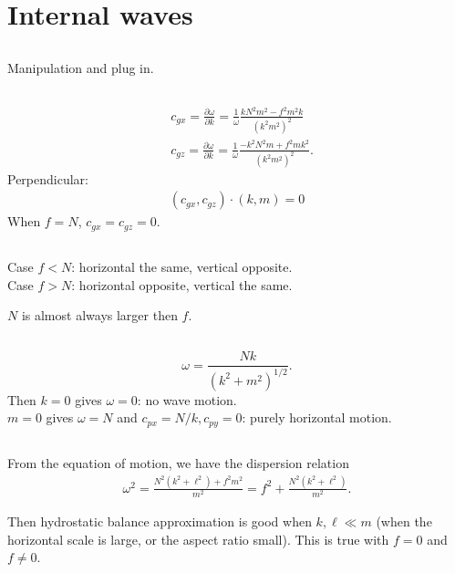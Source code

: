 \documentclass[11pt,letterpaper]{book}
\theoremstyle{definition}
\newcommand{\pe}{\partial}
\begin{document}
\section{Internal waves}\label{Dec_2010_2}
\subsection{}
Manipulation and plug in.

\subsection{}
\begin{align*}
&c_{gx} = \frac{\pe\omega}{\pe k} = \frac{1}{\omega}\frac{kN^2m^2-f^2m^2k}{(k^2m^2)^2}\\
&c_{gz} = \frac{\pe\omega}{\pe k} = \frac{1}{\omega}\frac{-k^2N^2m+f^2mk^2}{(k^2m^2)^2}.
\end{align*}
Perpendicular:
\begin{align*}
(c_{gx},c_{gz})\cdot (k,m) = 0
\end{align*}
When $f=N$, $c_{gx} = c_{gz} = 0$. 

\subsection{}
Case $f<N$: horizontal the same, vertical opposite.\\
Case $f>N$: horizontal opposite, vertical the same.

$N$ is almost always larger then $f$.

\subsection{}
$$\omega = \frac{Nk}{(k^2+m^2)^{1/2}}.$$
Then $k=0$ gives $\omega = 0$: no wave motion.\\
$m=0$ gives $\omega = N$ and $c_{px} = N/k, c_{py} = 0$: purely horizontal motion.

\subsection{}
From the equation of motion, we have the dispersion relation 
\begin{align*}
    \omega^2 = \frac{N^2(k^2+\ell^2)+f^2m^2}{m^2} = f^2 + \frac{N^2(k^2+\ell^2)}{m^2}.
\end{align*}

Then hydrostatic balance approximation is good when $k,\ell\ll m$ (when the horizontal scale is large, or the aspect ratio small). This is true with $f=0$ and $f\neq 0$.
\end{document}
